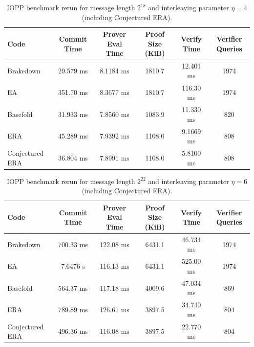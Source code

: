 \begin{table}[htbp]
\centering
\begin{tabular}{lccccc}
\hline
Code & Commit Time & Prover Eval Time & Proof Size (KiB) & Verify Time & Verifier Queries \\
\hline
Brakedown & 29.579 ms & 8.1184 ms & 1810.7 & 12.401 ms & 1974 \\
EA & 351.70 ms & 8.3677 ms & 1810.7 & 116.30 ms & 1974 \\
Basefold & 31.933 ms & 7.8560 ms & 1083.9 & 11.330 ms & 820 \\
ERA & 45.289 ms & 7.9392 ms & 1108.0 & 9.1669 ms & 808 \\
Conjectured ERA & 36.804 ms & 7.8991 ms & 1108.0 & 5.8100 ms & 808 \\
\hline
\end{tabular}
\caption{IOPP benchmark rerun for message length $2^{18}$ and interleaving parameter $\eta=4$ (including Conjectured ERA).}
\label{tab:iopp-rerun-218-eta4}
\end{table}

\begin{table}[htbp]
\centering
\begin{tabular}{lccccc}
\hline
Code & Commit Time & Prover Eval Time & Proof Size (KiB) & Verify Time & Verifier Queries \\
\hline
Brakedown & 700.33 ms & 122.08 ms & 6431.1 & 46.734 ms & 1974 \\
EA & 7.6476 s & 116.13 ms & 6431.1 & 525.00 ms & 1974 \\
Basefold & 564.37 ms & 117.18 ms & 4009.6 & 47.034 ms & 869 \\
ERA & 789.89 ms & 126.61 ms & 3897.5 & 34.740 ms & 804 \\
Conjectured ERA & 496.36 ms & 116.08 ms & 3897.5 & 22.770 ms & 804 \\
\hline
\end{tabular}
\caption{IOPP benchmark rerun for message length $2^{22}$ and interleaving parameter $\eta=6$ (including Conjectured ERA).}
\label{tab:iopp-rerun-222-eta6}
\end{table}
